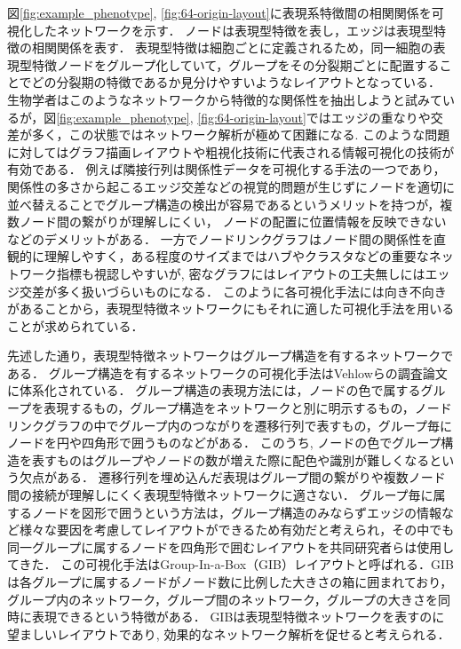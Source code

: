 \documentclass{kuee}
\begin{document}
図\ref{fig:example_phenotype}, \ref{fig:64-origin-layout}に表現系特徴間の相関関係を可視化したネットワークを示す．
ノードは表現型特徴を表し，エッジは表現型特徴の相関関係を表す．
表現型特徴は細胞ごとに定義されるため，同一細胞の表現型特徴ノードをグループ化していて，グループをその分裂期ごとに配置することでどの分裂期の特徴であるか見分けやすいようなレイアウトとなっている．
生物学者はこのようなネットワークから特徴的な関係性を抽出しようと試みているが，図\ref{fig:example_phenotype}, \ref{fig:64-origin-layout}ではエッジの重なりや交差が多く，この状態ではネットワーク解析が極めて困難になる.
このような問題に対してはグラフ描画レイアウトや粗視化技術に代表される情報可視化の技術が有効である．
例えば隣接行列は関係性データを可視化する手法の一つであり，関係性の多さから起こるエッジ交差などの視覚的問題が生じずにノードを適切に並べ替えることでグループ構造の検出が容易であるというメリットを持つが，複数ノード間の繋がりが理解しにくい，
ノードの配置に位置情報を反映できないなどのデメリットがある．
一方でノードリンクグラフはノード間の関係性を直観的に理解しやすく，ある程度のサイズまではハブやクラスタなどの重要なネットワーク指標も視認しやすいが, 密なグラフにはレイアウトの工夫無しにはエッジ交差が多く扱いづらいものになる．
このように各可視化手法には向き不向きがあることから，表現型特徴ネットワークにもそれに適した可視化手法を用いることが求められている．

先述した通り，表現型特徴ネットワークはグループ構造を有するネットワークである．
グループ構造を有するネットワークの可視化手法はVehlowらの調査論文に体系化されている\cite{Vehlow2017VisualizingGS}．
グループ構造の表現方法には，ノードの色で属するグループを表現するもの，グループ構造をネットワークと別に明示するもの，ノードリンクグラフの中でグループ内のつながりを遷移行列で表すもの，グループ毎にノードを円や四角形で囲うものなどがある．
このうち, ノードの色でグループ構造を表すものはグループやノードの数が増えた際に配色や識別が難しくなるという欠点がある．
遷移行列を埋め込んだ表現はグループ間の繋がりや複数ノード間の接続が理解しにくく表現型特徴ネットワークに適さない．
グループ毎に属するノードを図形で囲うという方法は，グループ構造のみならずエッジの情報など様々な要因を考慮してレイアウトができるため有効だと考えられ，その中でも同一グループに属するノードを四角形で囲むレイアウトを共同研究者らは使用してきた．
この可視化手法はGroup-In-a-Box（GIB）レイアウトと呼ばれる．GIB は各グループに属するノードがノード数に比例した大きさの箱に囲まれており，グループ内のネットワーク，グループ間のネットワーク，グループの大きさを同時に表現できるという特徴がある．
GIBは表現型特徴ネットワークを表すのに望ましいレイアウトであり, 効果的なネットワーク解析を促せると考えられる．
\end{document}
